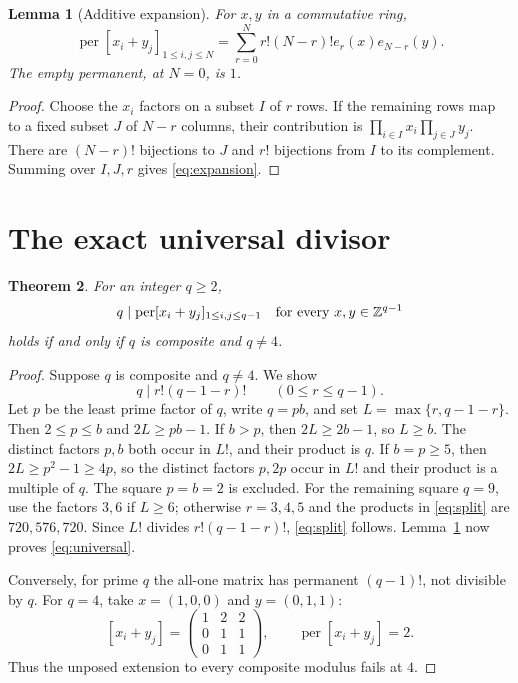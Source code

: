 \documentclass[11pt]{article}
\newcommand{\per}{\operatorname{per}}
\newtheorem{theorem}{Theorem}
\newtheorem{lemma}[theorem]{Lemma}
\begin{document}
\begin{lemma}[Additive expansion]\label{expansion}
For $x,y$ in a commutative ring,
\begin{equation}\label{eq:expansion}
 \per[x_i+y_j]_{1\le i,j\le N}
 =\sum_{r=0}^N r!(N-r)!e_r(x)e_{N-r}(y).
\end{equation}
The empty permanent, at $N=0$, is $1$.
\end{lemma}
\begin{proof}
Choose the $x_i$ factors on a subset $I$ of $r$ rows. If the remaining
rows map to a fixed subset $J$ of $N-r$ columns, their contribution is
$\prod_{i\in I}x_i\prod_{j\in J}y_j$.
There are $(N-r)!$ bijections to $J$ and $r!$ bijections from $I$ to
its complement. Summing over $I,J,r$ gives \eqref{eq:expansion}.
\end{proof}

\section{The exact universal divisor}
\begin{theorem}\label{universal}
For an integer $q\ge2$,
\begin{equation}\label{eq:universal}
 q\mid\per[x_i+y_j]_{1\le i,j\le q-1}
 \quad\hbox{for every }x,y\in\mathbb Z^{q-1}
\end{equation}
holds if and only if $q$ is composite and $q\ne4$.
\end{theorem}
\begin{proof}
Suppose $q$ is composite and $q\ne4$. We show
\begin{equation}\label{eq:split}
 q\mid r!(q-1-r)!\qquad(0\le r\le q-1).
\end{equation}
Let $p$ be the least prime factor of $q$, write $q=pb$, and set
$L=\max\{r,q-1-r\}$. Then $2\le p\le b$ and $2L\ge pb-1$.
If $b>p$, then $2L\ge2b-1$, so $L\ge b$. The distinct factors
$p,b$ both occur in $L!$, and their product is $q$.
If $b=p\ge5$, then $2L\ge p^2-1\ge4p$, so the distinct factors
$p,2p$ occur in $L!$ and their product is a multiple of $q$.
The square $p=b=2$ is excluded. For the remaining square $q=9$,
use the factors $3,6$ if $L\ge6$; otherwise $r=3,4,5$ and the
products in \eqref{eq:split} are $720,576,720$.
Since $L!$ divides $r!(q-1-r)!$, \eqref{eq:split} follows.
Lemma~\ref{expansion} now proves \eqref{eq:universal}.

Conversely, for prime $q$ the all-one matrix has permanent $(q-1)!$,
not divisible by $q$. For $q=4$, take $x=(1,0,0)$ and $y=(0,1,1)$:
\[
 [x_i+y_j]=\begin{pmatrix}1&2&2\\0&1&1\\0&1&1\end{pmatrix},
 \qquad\per[x_i+y_j]=2.
\]
Thus the unposed extension to every composite modulus fails at $4$.
\end{proof}
\end{document}
